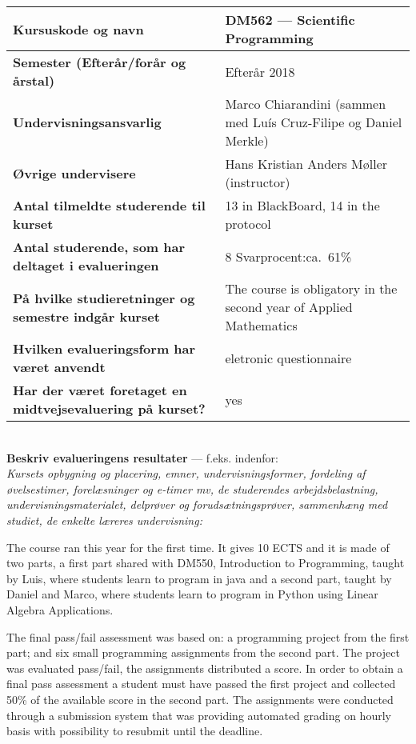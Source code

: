 \documentclass[11pt]{article}
\begin{document}
\tabulinesep=1.2mm
\begin{tabu} to 1.0 \hline
Kursuskode og navn &  DM562 --- Scientific Programming \\\hline
Semester {\normalfont (Efterår/forår og årstal)} & Efterår 2018 \\\hline
Undervisnings\-ansvarlig &  Marco Chiarandini (sammen med Luís Cruz-Filipe og Daniel Merkle) \\\hline
Øvrige undervisere &  Hans Kristian Anders Møller (instructor) \\\hline
Antal tilmeldte studerende til kurset & 13 in BlackBoard, 14 in the protocol \\\hline
Antal studerende, som har deltaget i evalueringen &  8  \hfill
Svarprocent:ca.~61\% \\\hline
På hvilke studieretninger og semestre indgår kurset &  The course is obligatory in the second year of Applied Mathematics \\\hline
Hvilken evalueringsform har været anvendt &  eletronic questionnaire \\\hline
Har der været foretaget en midtvejsevaluering på kurset? &  yes  \\ 
\hline
\end{tabu}

~\\[1cm]\textcolor{sdublue}{{\bf Beskriv evalueringens resultater} ---
  f.eks. indenfor:\\ {\small \em Kursets opbygning og placering,
    emner, undervisningsformer, fordeling af øvelsestimer,
    forelæsninger og e-timer mv, de studerendes arbejdsbelastning,
    undervisningsmaterialet, delprøver og forudsætningsprøver,
    sammenhæng med studiet, de enkelte læreres undervisning:}}



The course ran this year for the first time. It gives 10 ECTS and it
is made of two parts, a first part shared with DM550, Introduction to
Programming, taught by Luis, where students learn to program in java
and a second part, taught by Daniel and Marco, where students learn to
program in Python using Linear Algebra Applications.

The final pass/fail assessment was based on: a programming project from
the first part; and six small programming assignments from the second
part. The project was evaluated pass/fail, the assignments distributed a
score. In order to obtain a final pass assessment a student must have
passed the first project and collected 50\% of the available score in
the second part. The assignments were conducted through a submission
system that was providing automated grading on hourly basis with
possibility to resubmit until the deadline.
\end{document}
